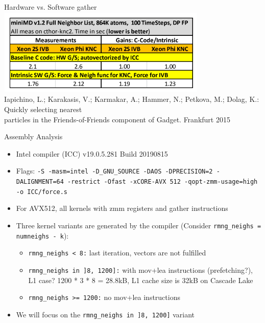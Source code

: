 \documentclass[aspectratio=169,t]{beamer}
\begin{document}
  \begin{frame}[fragile]{Hardware vs. Software gather}
  \centering
    \includegraphics[width=10cm]{minimd_hw_vs_sw_results_table.png}
    \\Iapichino, L.; Karakasis, V.; Karmakar, A.; Hammer, N.; Petkova, M.; Dolag, K.: Quickly selecting nearest \\particles in the Friends-of-Friends component of Gadget. Frankfurt 2015
  \end{frame}

  \begin{frame}[fragile]{Assembly Analysis}
    \begin{itemize}
      \item Intel compiler (ICC) v19.0.5.281 Build 20190815
      \item Flags: \texttt{-S -masm=intel -D\_GNU\_SOURCE -DAOS -DPRECISION=2 -DALIGNMENT=64 -restrict -Ofast -xCORE-AVX 512 -qopt-zmm-usage=high -o ICC/force.s}
      \item For AVX512, all kernels with zmm registers and gather instructions
      \item Three kernel variants are generated by the compiler (Consider \texttt{rmng\_neighs = numneighs - k}):
      \begin{itemize}
        \item \texttt{rmng\_neighs < 8:} last iteration, vectors are not fulfilled
        \item \texttt{rmng\_neighs in ]8, 1200]:} with mov+lea instructions (prefetching?), L1 case? 1200 * 3 * 8 = 28.8kB, L1 cache size is 32kB on Cascade Lake
        \item \texttt{rmng\_neighs >= 1200:} no mov+lea instructions
      \end{itemize}
      \item We will focus on the \texttt{rmng\_neighs in ]8, 1200]} variant
    \end{itemize}
  \end{frame}
\end{document}
